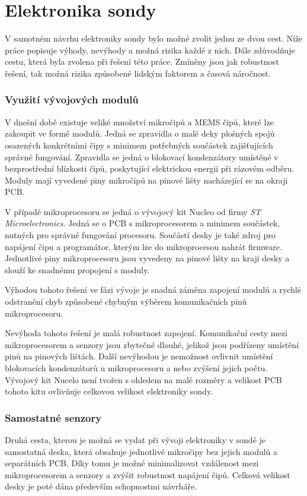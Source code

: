 \documentclass[twoside]{ctuthesis}
\theoremstyle{plain}
\theoremstyle{definition}
\theoremstyle{note}
\begin{document}
	
	\section{Elektronika sondy}

	V samotném návrhu elektroniky sondy bylo možné zvolit jednu ze dvou cest. Níže práce popisuje výhody, nevýhody a možná rizika každé z nich. Dále zdůvodňuje cestu, která byla zvolena při řešení této práce. Zmíněny jsou jak robustnost řešení, tak možná rizika způsobené lidským faktorem a časová náročnost.

	\subsubsection{Využití vývojových modulů}
	V dnešní době existuje veliké množství mikročipů a MEMS čipů, které lze zakoupit ve formě modulů. Jedná se zpravidla o malé deky plošných spojů osazených konkrétními čipy s minimem potřebných součástek zajišťujících správné fungování. Zpravidla se jedná o blokovací kondenzátory umístěné v bezprostřední blízkosti čipů, poskytující elektrickou energii při rázovém odběru. Moduly mají vyvedené piny mikročipů na pinové lišty nacházející se na okraji PCB. 

	V případě mikroprocesoru se jedná o vývojový kit Nucleo od firmy \textit{ST Microelectronics}. Jedná se o PCB s mikroprocesorem a minimem součástek, nutných pro správné fungování procesoru. Součástí desky je také zdroj pro napájení čipu a programátor, kterým lze do mikroprocesou nahrát firmware. Jednotlivé piny mikroprocesoru jsou vyvedeny na pinové lišty na kraji desky a slouží ke snadnému propojení s moduly. 

	Výhodou tohoto řešení ve fázi vývoje je snadná záměna zapojení modulů a rychlé odstranění chyb způsobené chybným výběrem komunikačních pinů mikroprocesoru.

	Nevýhoda tohoto řešení je malá robustnost zapojení. Komunikační cesty mezi mikroprocesorem a senzory jsou zbytečné dlouhé, jelikož jsou podřízeny umístění pinů na pinových lištách. Další nevýhodou je nemožnost ovlivnit umístění blokovacích kondenzátorů u mikroprocesoru a nebo zvýšení jejich počtu. Vývojový kit Nucelo není tvořen s ohledem na malé rozměry a velikost PCB tohoto kitu ovlivňuje celkovou velikost elektroniky sondy.

	\subsubsection{Samostatné senzory}
	Druhá cesta, kterou je možná se vydat při vývoji elektroniky v sondě je samostatná deska, která obsahuje jednotlivé mikročipy bez jejich modulů a separátních PCB. Díky tomu je možné minimalizovat vzdálenost mezi mikroprocesorem a senzory a zvýšit robustnost napájení čipů. Celková velikost desky je poté dána především schopnostmi návrháře. 
\end{document}
